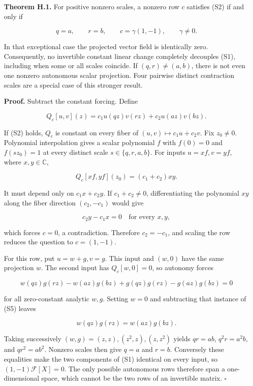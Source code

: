 \textbf{Theorem H.1.} For positive nonzero scales, a nonzero row \(c\)
satisfies (S2) if and only if

\[
q=a,\qquad r=b,\qquad c=\gamma(1,-1),\qquad\gamma\ne0.
\tag{S3}
\]

In that exceptional case the projected vector field is identically zero.
Consequently, no invertible constant linear change completely decouples
(S1), including when some or all scales coincide. If \((q,r)\ne(a,b)\),
there is not even one nonzero autonomous scalar projection. Four
pairwise distinct contraction scales are a special case of this stronger
result.

\textbf{Proof.} Subtract the constant forcing. Define

\[
Q_c[u,v](z)=c_1u(qz)v(rz)+c_2u(az)v(bz).
\]

If (S2) holds, \(Q_c\) is constant on every fiber of
\((u,v)\mapsto c_1u+c_2v\). Fix \(z_0\ne0\). Polynomial interpolation
gives a scalar polynomial \(f\) with \(f(0)=0\) and \(f(sz_0)=1\) at
every distinct scale \(s\in\{q,r,a,b\}\). For inputs \(u=xf,v=yf\),
where \(x,y\in\mathbb C\),

\[
Q_c[xf,yf](z_0)=(c_1+c_2)xy.
\tag{S4}
\]

It must depend only on \(c_1x+c_2y\). If \(c_1+c_2\ne0\),
differentiating the polynomial \(xy\) along the fiber direction
\((c_2,-c_1)\) would give

\[
c_2y-c_1x=0\quad\text{for every }x,y,
\]

which forces \(c=0\), a contradiction. Therefore \(c_2=-c_1\), and
scaling the row reduces the question to \(c=(1,-1)\).

For this row, put \(u=w+g,v=g\). This input and \((w,0)\) have the same
projection \(w\). The second input has \(Q_c[w,0]=0\), so autonomy
forces

\[
w(qz)g(rz)-w(az)g(bz)
+g(qz)g(rz)-g(az)g(bz)=0
\tag{S5}
\]

for all zero-constant analytic \(w,g\). Setting \(w=0\) and subtracting
that instance of (S5) leaves

\[
w(qz)g(rz)=w(az)g(bz).
\tag{S6}
\]

Taking successively \((w,g)=(z,z),(z^2,z),(z,z^2)\) yields \(qr=ab\),
\(q^2r=a^2b\), and \(qr^2=ab^2\). Nonzero scales then give \(q=a\) and
\(r=b\). Conversely these equalities make the two components of (S1)
identical on every input, so \((1,-1)\mathcal F[X]=0\). The only
possible autonomous rows therefore span a one-dimensional space, which
cannot be the two rows of an invertible matrix. \(\square\)


